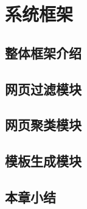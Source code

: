 
\chapter{系统框架}
\label{chap:framework}

\section{整体框架介绍}
\label{sec:wholeframework}

\section{网页过滤模块}
\label{sec:filterintro}

\section{网页聚类模块}
\label{sec:clusterintro}

\section{模板生成模块}
\label{sec:templateintro}

\section{本章小结}
\label{sec:summaryframework}


